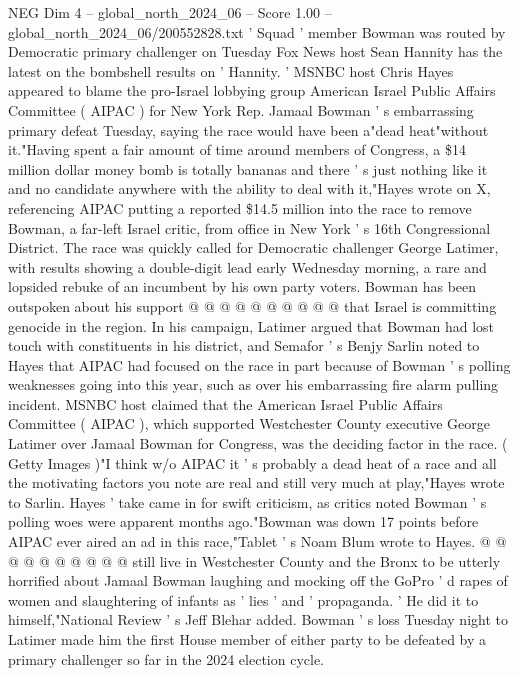 \begin{textsample}{NEG Dim 4 – global\_north\_2024\_06 – Score 1.00 – global\_north\_2024\_06/200552828.txt}  \label{ex:f4_neg_312}
' Squad ' member Bowman was routed by Democratic primary challenger on Tuesday Fox News host Sean Hannity has the latest on the bombshell results on ' Hannity. ' MSNBC host Chris Hayes appeared to blame the pro-Israel lobbying group American Israel Public Affairs Committee ( AIPAC ) for New York Rep.
Jamaal Bowman ' s embarrassing primary defeat Tuesday, saying the race would have been a"dead heat"without it."Having spent a fair amount of time around members of Congress, a \$14 million dollar money bomb is totally bananas and there ' s just nothing like it and no candidate anywhere with the ability to deal with it,"Hayes wrote on X, referencing AIPAC putting a reported \$14.5 million into the race to remove Bowman, a far-left Israel critic, from office in New York ' s 16th Congressional District.
The race was quickly called for Democratic challenger George Latimer, with results showing a double-digit lead early Wednesday morning, a rare and lopsided rebuke of an incumbent by his own party voters.
Bowman has been outspoken about his support @ @ @ @ @ @ @ @ @ @ that Israel is committing genocide in the region.
In his campaign, Latimer argued that Bowman had lost touch with constituents in his district, and Semafor ' s Benjy Sarlin noted to Hayes that AIPAC had focused on the race in part because of Bowman ' s polling weaknesses going into this year, such as over his embarrassing fire alarm pulling incident.
MSNBC host claimed that the American Israel Public Affairs Committee ( AIPAC ), which supported Westchester County executive George Latimer over Jamaal Bowman for Congress, was the deciding factor in the race. ( Getty Images )"I think w/o AIPAC it ' s probably a dead heat of a race and all the motivating factors you note are real and still very much at play,"Hayes wrote to Sarlin.
Hayes ' take came in for swift criticism, as critics noted Bowman ' s polling woes were apparent months ago."Bowman was down 17 points before AIPAC ever aired an ad in this race,"Tablet ' s Noam Blum wrote to Hayes. @ @ @ @ @ @ @ @ @ @ still live in Westchester County and the Bronx to be utterly horrified about Jamaal Bowman laughing and mocking off the GoPro ' d rapes of women and slaughtering of infants as ' lies ' and ' propaganda. ' He did it to himself,"National Review ' s Jeff Blehar added.
Bowman ' s loss Tuesday night to Latimer made him the first House member of either party to be defeated by a primary challenger so far in the 2024 election cycle.

\end{textsample}
